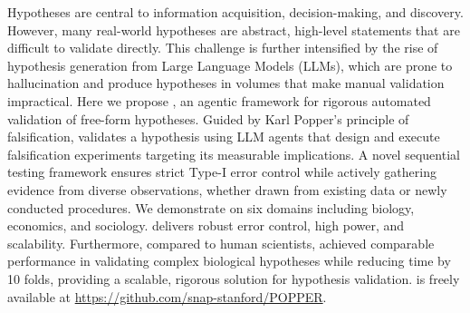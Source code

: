 
Hypotheses are central to information acquisition, decision-making, and discovery. However, many real-world hypotheses are abstract, high-level statements that are difficult to validate directly. 
This challenge is further intensified by the rise of hypothesis generation from Large Language Models (LLMs), which are prone to hallucination and produce hypotheses in volumes that make manual validation impractical. Here we propose \mname, an agentic framework for rigorous automated validation of free-form hypotheses. 
Guided by Karl Popper's principle of falsification, \mname validates a hypothesis using LLM agents that design and execute falsification experiments targeting its measurable implications. A novel sequential testing framework ensures strict Type-I error control while actively gathering evidence from diverse observations, whether drawn from existing data or newly conducted procedures.
We demonstrate \mname on six domains including biology, economics, and sociology. \mname delivers robust error control, high power, and scalability. Furthermore, compared to human scientists, \mname achieved comparable performance in validating complex biological hypotheses while reducing time by 10 folds, providing a scalable, rigorous solution for hypothesis validation. \mname is freely available at \url{https://github.com/snap-stanford/POPPER}.



